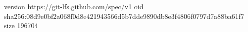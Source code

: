 version https://git-lfs.github.com/spec/v1
oid sha256:08d9e0bf2a068f0d8e421943566d5b7dde9890db8e3f4806f0797d7a88ba61f7
size 196704
